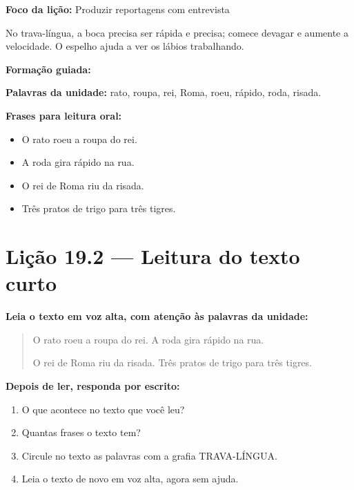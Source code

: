 \textbf{Foco da lição:} Produzir reportagens com entrevista


\begin{boquinha}
No trava-língua, a boca precisa ser rápida e precisa; comece devagar e aumente a velocidade. O espelho ajuda a ver os lábios trabalhando.
\end{boquinha}

\noindent\textbf{Formação guiada:}

\begin{center}
\end{center}

\noindent\textbf{Palavras da unidade:} rato, roupa, rei, Roma, roeu, rápido, roda, risada.

\noindent\textbf{Frases para leitura oral:}
\begin{itemize}[leftmargin=1.6em]
  \item O rato roeu a roupa do rei.
  \item A roda gira rápido na rua.
  \item O rei de Roma riu da risada.
  \item Três pratos de trigo para três tigres.
\end{itemize}

\section{Lição 19.2 --- Leitura do texto curto}

\noindent\textbf{Leia o texto em voz alta, com atenção às palavras da unidade:}


\begin{quote}
O rato roeu a roupa do rei. A roda gira rápido na rua.

O rei de Roma riu da risada. Três pratos de trigo para três tigres.
\end{quote}

\textbf{Depois de ler, responda por escrito:}
\begin{enumerate}

  \item O que acontece no texto que você leu?
  \begin{center}
  \underline{\hspace{12cm}}
  \end{center}

  \item Quantas frases o texto tem?
  \begin{center}
  \underline{\hspace{12cm}}
  \end{center}

  \item Circule no texto as palavras com a grafia TRAVA-LÍNGUA.

  \item Leia o texto de novo em voz alta, agora sem ajuda.

\end{enumerate}

